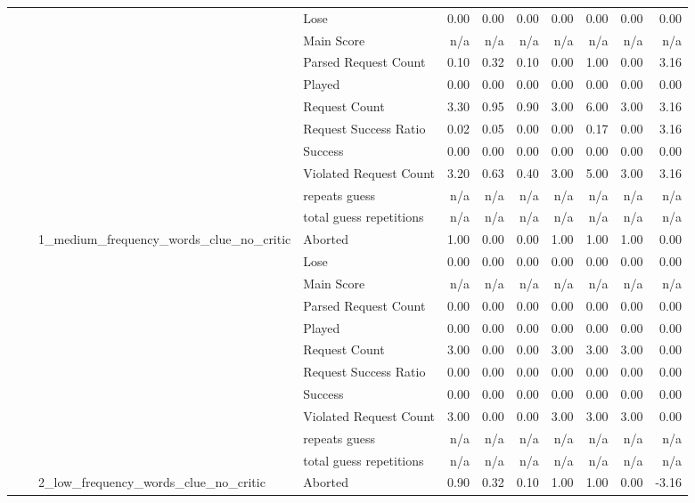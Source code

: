 \begin{tabular}{llllrrrrrrr}
 &  &  & Lose & 0.00 & 0.00 & 0.00 & 0.00 & 0.00 & 0.00 & 0.00 \\
 &  &  & Main Score & n/a & n/a & n/a & n/a & n/a & n/a & n/a \\
 &  &  & Parsed Request Count & 0.10 & 0.32 & 0.10 & 0.00 & 1.00 & 0.00 & 3.16 \\
 &  &  & Played & 0.00 & 0.00 & 0.00 & 0.00 & 0.00 & 0.00 & 0.00 \\
 &  &  & Request Count & 3.30 & 0.95 & 0.90 & 3.00 & 6.00 & 3.00 & 3.16 \\
 &  &  & Request Success Ratio & 0.02 & 0.05 & 0.00 & 0.00 & 0.17 & 0.00 & 3.16 \\
 &  &  & Success & 0.00 & 0.00 & 0.00 & 0.00 & 0.00 & 0.00 & 0.00 \\
 &  &  & Violated Request Count & 3.20 & 0.63 & 0.40 & 3.00 & 5.00 & 3.00 & 3.16 \\
 &  &  & repeats guess & n/a & n/a & n/a & n/a & n/a & n/a & n/a \\
 &  &  & total guess repetitions & n/a & n/a & n/a & n/a & n/a & n/a & n/a \\
\cline{3-11}
 &  & \multirow[t]{11}{*}{1_medium_frequency_words_clue_no_critic} & Aborted & 1.00 & 0.00 & 0.00 & 1.00 & 1.00 & 1.00 & 0.00 \\
 &  &  & Lose & 0.00 & 0.00 & 0.00 & 0.00 & 0.00 & 0.00 & 0.00 \\
 &  &  & Main Score & n/a & n/a & n/a & n/a & n/a & n/a & n/a \\
 &  &  & Parsed Request Count & 0.00 & 0.00 & 0.00 & 0.00 & 0.00 & 0.00 & 0.00 \\
 &  &  & Played & 0.00 & 0.00 & 0.00 & 0.00 & 0.00 & 0.00 & 0.00 \\
 &  &  & Request Count & 3.00 & 0.00 & 0.00 & 3.00 & 3.00 & 3.00 & 0.00 \\
 &  &  & Request Success Ratio & 0.00 & 0.00 & 0.00 & 0.00 & 0.00 & 0.00 & 0.00 \\
 &  &  & Success & 0.00 & 0.00 & 0.00 & 0.00 & 0.00 & 0.00 & 0.00 \\
 &  &  & Violated Request Count & 3.00 & 0.00 & 0.00 & 3.00 & 3.00 & 3.00 & 0.00 \\
 &  &  & repeats guess & n/a & n/a & n/a & n/a & n/a & n/a & n/a \\
 &  &  & total guess repetitions & n/a & n/a & n/a & n/a & n/a & n/a & n/a \\
\cline{3-11}
 &  & \multirow[t]{11}{*}{2_low_frequency_words_clue_no_critic} & Aborted & 0.90 & 0.32 & 0.10 & 1.00 & 1.00 & 0.00 & -3.16 \\

\end{tabular}
